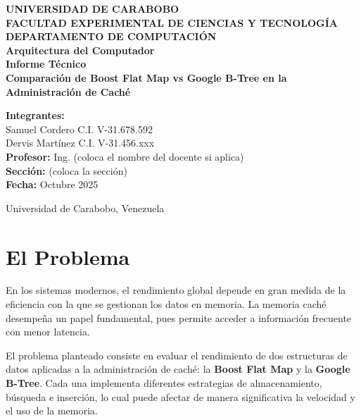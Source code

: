 \documentclass[12pt,a4paper]{article}
\begin{document}
\begin{titlepage}
\centering
{\large \textbf{UNIVERSIDAD DE CARABOBO}}\\[0.2cm]
{\large \textbf{FACULTAD EXPERIMENTAL DE CIENCIAS Y TECNOLOGÍA}}\\[0.2cm]
{\large \textbf{DEPARTAMENTO DE COMPUTACIÓN}}\\[1.5cm]

{\Large \textbf{Arquitectura del Computador}}\\[2cm]

{\Huge \textbf{Informe Técnico}}\\[0.8cm]
{\LARGE \textbf{Comparación de Boost Flat Map vs Google B-Tree en la Administración de Caché}}\\[2cm]

\begin{flushleft}
\textbf{Integrantes:}\\
Samuel Cordero \hspace{0.3cm} C.I. V-31.678.592\\
Dervis Martínez \hspace{0.3cm} C.I. V-31.456.xxx\\[1cm]

\textbf{Profesor:} Ing. (coloca el nombre del docente si aplica)\\[1cm]
\textbf{Sección:} (coloca la sección)\\[1cm]
\textbf{Fecha:} Octubre 2025
\end{flushleft}

\vfill

{\large Universidad de Carabobo, Venezuela}
\end{titlepage}

\tableofcontents
\newpage

\section{El Problema}

En los sistemas modernos, el rendimiento global depende en gran medida de la eficiencia con la que se gestionan los datos en memoria.  
La memoria caché desempeña un papel fundamental, pues permite acceder a información frecuente con menor latencia.

El problema planteado consiste en evaluar el rendimiento de dos estructuras de datos aplicadas a la administración de caché:  
la \textbf{Boost Flat Map} y la \textbf{Google B-Tree}.  
Cada una implementa diferentes estrategias de almacenamiento, búsqueda e inserción, lo cual puede afectar de manera significativa la velocidad y el uso de la memoria.
\end{document}
